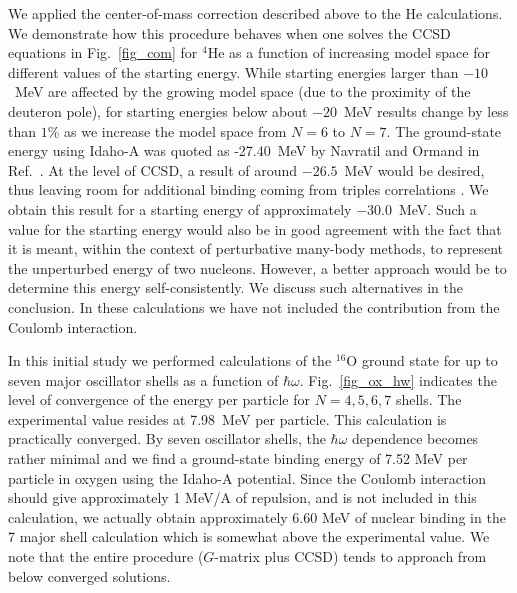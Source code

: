 We applied the center-of-mass correction described above to the 
He calculations. We demonstrate 
how this procedure behaves when one solves the CCSD equations in
Fig.~\ref{fig_com} for $^{4}$He as a function of increasing 
model space for different values of the starting energy. While 
starting energies larger than $-10$~MeV are affected by the 
growing model space (due to the proximity of the deuteron pole), for
starting energies below about $-20$~MeV results change by less than
$1\%$ as we increase the model space from $N=6$ to $N=7$. 
The ground-state energy using
Idaho-A was quoted as -27.40~MeV by Navratil and Ormand in
Ref.~\cite{petr_erich02}. At the level of CCSD, a result of around $-26.5$~MeV
would be desired, thus leaving room for additional binding coming
from triples correlations \cite{ccsdt03}. We obtain this result for a
starting energy of approximately $-30.0$~MeV. 
Such a value for the 
starting energy would also be in good agreement with the fact that it is
meant, within the context  of perturbative many-body methods, to represent
the unperturbed energy of two nucleons. However, a better approach would be to
determine this energy self-consistently. We discuss such alternatives 
in the conclusion. In these calculations we have not included the contribution
from the Coulomb interaction.  

In this initial study we performed calculations of the $^{16}$O 
ground state for up to seven major oscillator shells as a function
of $\hbar\omega$. Fig.~\ref{fig_ox_hw} indicates the level of convergence
of the energy per particle for $N=4,5,6,7$ shells. The experimental value
resides at 7.98~MeV per particle.  This calculation is practically converged. 
By seven oscillator shells, the $\hbar\omega$ dependence becomes rather
minimal and we find a ground-state binding energy of 7.52 MeV per particle in
oxygen using the Idaho-A potential. Since the Coulomb interaction should give
approximately 1 MeV/A of repulsion, and is not included in this 
calculation, we actually obtain approximately 6.60 MeV of nuclear binding
in the 7 major shell calculation which is somewhat above the experimental
value. We note that the entire procedure ($G$-matrix plus CCSD) tends to 
approach from below converged solutions. 

